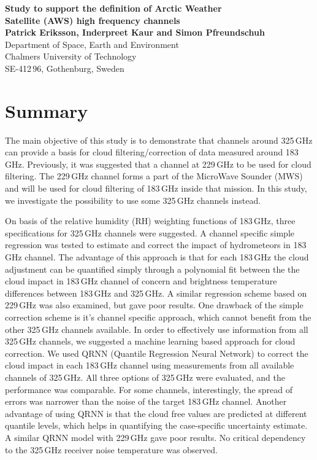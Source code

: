 \documentclass[12pt]{article}
\begin{document}


\noindent
\textbf{\Large Study to support the definition of Arctic Weather \vspace{1mm}\\
Satellite (AWS) high frequency channels} \vspace{8mm}\\
{\bf Patrick Eriksson, Inderpreet Kaur and Simon Pfreundschuh}\\
Department of Space, Earth and Environment\\
Chalmers University of Technology\\
SE-412\,96, Gothenburg, Sweden\vspace{10mm}

\section*{Summary}
%
The main objective of this study is to demonstrate that channels around
325\,GHz can provide a basis for cloud filtering/correction of data measured
around 183\,GHz. Previously, it was suggested that a channel at 229\,GHz to be
used for cloud filtering. The 229\,GHz channel forms a part of the MicroWave
Sounder (MWS) and will be used for cloud filtering of 183\,GHz inside that
mission. In this study, we investigate the possibility to use some 325\,GHz
channels instead.

On basis of the relative humidity (RH) weighting functions of 183\,GHz, three specifications for 325\,GHz channels were suggested. A channel specific simple regression was tested to estimate and correct the impact of hydrometeors in 183\,GHz channel.
The advantage of this approach is that for each 183\,GHz the cloud adjustment
can be quantified simply through a polynomial fit between the the cloud impact
in 183\,GHz channel of concern and brightness temperature differences between
183\,GHz and 325\,GHz. A similar regression scheme based on 229\,GHz was also
examined, but gave poor results. One drawback of the simple correction scheme
is it's channel specific approach, which cannot benefit from the other 325\,GHz
channels available. In order to effectively use information from all 325\,GHz
channels, we suggested a machine learning based approach for cloud correction.
We used QRNN (Quantile Regression Neural Network) to correct the cloud
impact in each 183\,GHz channel using measurements from all available channels
of 325\,GHz. All three options of 325\,GHz were evaluated, and the performance
was comparable. For some channels, interestingly, the spread of errors was
narrower than the noise of the target 183\,GHz channel. Another advantage of
using QRNN is that the cloud free values are predicted at different quantile
levels, which helps in quantifying the case-specific uncertainty estimate. A
similar QRNN model with 229\,GHz gave poor results. No critical dependency to
the 325\,GHz receiver noise temperature was observed.
\end{document}
